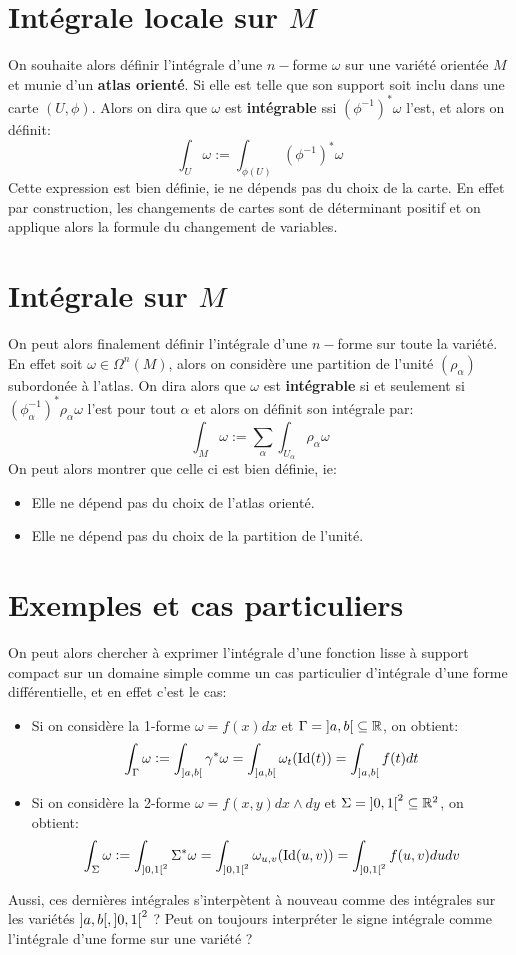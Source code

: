 \section{Intégrale locale sur \( M \)}
On souhaite alors définir l'intégrale d'une \( n-\)forme \(\omega\) sur une variété orientée \( M \) et munie d'un \textbf{atlas orienté}. Si elle est telle que son support soit inclu dans une carte \( (U, \phi) \). Alors on dira que \( \omega \) est \textbf{intégrable} ssi \( (\phi^{-1})^*\omega \) l'est, et alors on définit:
\[ 
   \int_U \omega := \int_{ \phi(U)} (\phi^{-1})^*\omega 
\]
Cette expression est bien définie, ie ne dépends pas du choix de la carte. En effet par construction, les changements de cartes sont de déterminant positif et on applique alors la formule du changement de variables.
\section{Intégrale sur \( M \)}
On peut alors finalement définir l'intégrale d'une \( n-\)forme sur toute la variété. En effet soit \( \omega \in \Omega^n(M) \), alors on considère une partition de l'unité \( (\rho_\alpha) \) subordonée à l'atlas. On dira alors que \( \omega \) est \textbf{intégrable} si et seulement si \( (\phi_\alpha^{-1})^*\rho_\alpha \omega  \) l'est pour tout \( \alpha \) et alors on définit son intégrale par:
\[ 
   \int_M \omega := \sum_\alpha \int_{U_\alpha} \rho_\alpha \omega 
\]
On peut alors montrer que celle ci est bien définie, ie:
\begin{itemize}
   \item Elle ne dépend pas du choix de l'atlas orienté.
   \item Elle ne dépend pas du choix de la partition de l'unité.
\end{itemize}
\section{Exemples et cas particuliers}
On peut alors chercher à exprimer l'intégrale d'une fonction lisse à support compact sur un domaine simple comme un cas particulier d'intégrale d'une forme différentielle, et en effet c'est le cas:
\begin{itemize}
   \item Si on considère la 1-forme \( \omega = f(x)dx \) et \( \Gamma = \ioo{a}{b} \subseteq \R\), on obtient:
   \[ 
      \int_\Gamma \omega := \int_{\ioo{a}{b}}  \gamma^*\omega = \int_{\ioo{a}{b}}  \omega_{t}(\text{Id}(t)) = \int_{\ioo{a}{b}} f(t)dt
   \]
   \item Si on considère la 2-forme \( \omega = f(x, y)dx \wedge dy \) et \( \Sigma = \ioo{0}{1}^2 \subseteq \R^2 \), on obtient:
   \[ 
      \int_\Sigma \omega := \int_{\ioo{0}{1}^2}  \Sigma^*\omega = \int_{\ioo{0}{1}^2}   \omega_{u, v}(\text{Id}(u, v)) = \int_{\ioo{0}{1}^2}  f(u, v)dudv
   \]
\end{itemize}
Aussi, ces dernières intégrales s'interpètent à nouveau comme des intégrales sur les variétés \( \ioo{a}{b}, \ioo{0}{1}^2 \) ? Peut on toujours interpréter le signe intégrale comme l'intégrale d'une forme sur une variété ?\<

